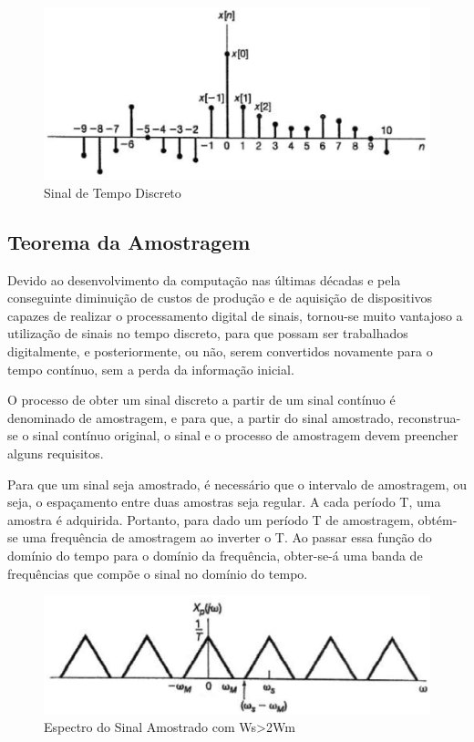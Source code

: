 \begin{figure}[h]
	\centering
    \includegraphics[scale=0.5]{figuras/fig02.eps}
	\caption{Sinal de Tempo Discreto}
	\label{fig02}
\end{figure}

\subsection{Teorema da Amostragem}
Devido ao desenvolvimento da computação nas últimas décadas e pela conseguinte diminuição de custos de produção e de aquisição de dispositivos capazes de realizar o processamento digital de sinais, tornou-se muito vantajoso a utilização de sinais no tempo discreto, para que possam ser trabalhados digitalmente, e posteriormente, ou não, serem convertidos novamente para o tempo contínuo, sem a perda da informação inicial. 

O processo de obter um sinal discreto a partir de um sinal contínuo é denominado de amostragem, e para que, a partir do sinal amostrado, reconstrua-se o sinal contínuo original, o sinal e o processo de amostragem devem preencher alguns requisitos.

Para que um sinal seja amostrado, é necessário que o intervalo de amostragem, ou seja, o espaçamento entre duas amostras seja regular. A cada período T, uma amostra é adquirida. Portanto, para dado um período T de amostragem, obtém-se uma frequência de amostragem ao inverter o T. 
Ao passar essa função do domínio do tempo para o domínio da frequência, obter-se-á uma banda de frequências que compõe o sinal no domínio do tempo. 

\begin{figure}[h]
	\centering
    \includegraphics[scale=0.5]{figuras/fig03.eps}
	\caption{Espectro do Sinal Amostrado com Ws>2Wm}
	\label{fig03}
\end{figure}

